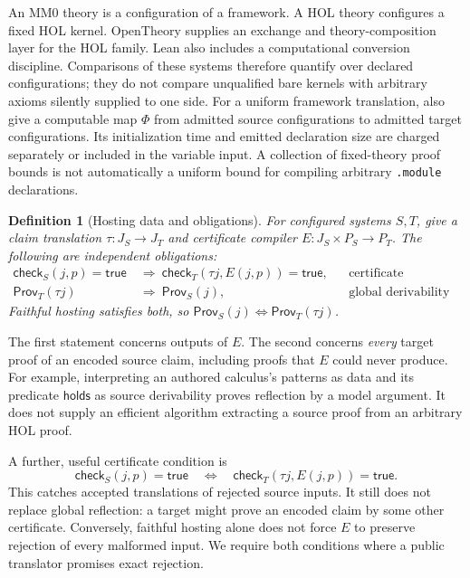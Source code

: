 \documentclass[11pt]{article}
\newtheorem{definition}{Definition}
\newcommand{\proofCheck}{\mathsf{check}}
\newcommand{\Prov}{\mathsf{Prov}}
\newcommand{\code}[1]{\nolinkurl{#1}}
\begin{document}
An MM0 theory is a configuration of a framework. A HOL theory configures a
fixed HOL kernel. OpenTheory supplies an exchange and theory-composition
layer for the HOL family. Lean also includes a computational conversion
discipline. Comparisons of these systems therefore quantify over declared
configurations; they do not compare unqualified bare kernels with arbitrary
axioms silently supplied to one side.
For a uniform framework translation, also give a computable map
$\Phi$ from admitted source configurations to admitted target
configurations. Its initialization time and emitted declaration size
are charged separately or included in the variable input. A collection
of fixed-theory proof bounds is not automatically a uniform bound for
compiling arbitrary \code{.module} declarations.

\begin{definition}[Hosting data and obligations]
For configured systems $S,T$, give a claim translation
$\tau:J_S\to J_T$ and certificate compiler
$E:J_S\times P_S\to P_T$. The following are independent obligations:
\begin{align*}
 \proofCheck_S(j,p)=\mathsf{true}
   &\ \Longrightarrow\ \proofCheck_T(\tau j,E(j,p))=\mathsf{true},
     &&\text{certificate preservation;}\\
 \Prov_T(\tau j)&\ \Longrightarrow\ \Prov_S(j),
     &&\text{global derivability reflection.}
\end{align*}
Faithful hosting satisfies both, so
$\Prov_S(j)\Longleftrightarrow\Prov_T(\tau j)$.
\end{definition}

The first statement concerns outputs of $E$. The second concerns
\emph{every} target proof of an encoded source claim, including proofs
that $E$ could never produce. For example, interpreting an authored
calculus's patterns as data and its predicate $\mathsf{holds}$ as source
derivability proves reflection by a model argument. It does not supply an
efficient algorithm extracting a source proof from an arbitrary HOL proof.

A further, useful certificate condition is
\[
 \proofCheck_S(j,p)=\mathsf{true}\quad\Longleftrightarrow\quad
 \proofCheck_T(\tau j,E(j,p))=\mathsf{true}.
\]
This catches accepted translations of rejected source inputs. It still
does not replace global reflection: a target might prove an encoded claim
by some other certificate. Conversely, faithful hosting alone does not
force $E$ to preserve rejection of every malformed input. We require
both conditions where a public translator promises exact rejection.
\end{document}
